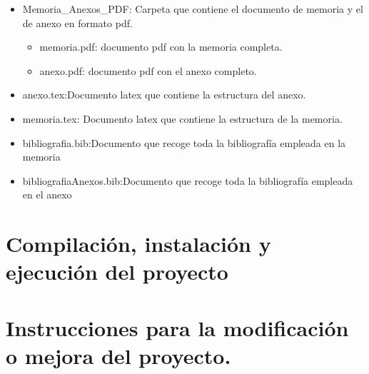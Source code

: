 \begin{itemize}
    \item Memoria\_Anexos\_PDF: Carpeta que contiene el documento de memoria y el de anexo en formato pdf.
    \begin{itemize}
        \item memoria.pdf: documento pdf con la memoria completa.
        \item anexo.pdf: documento pdf con el anexo completo.
    \end{itemize}
    \item anexo.tex:Documento latex que contiene la estructura del anexo.
    \item memoria.tex: Documento latex que contiene la estructura de la memoria.
    \item bibliografia.bib:Documento que recoge toda la bibliografía empleada en la memoria
    \item bibliografiaAnexos.bib:Documento que recoge toda la bibliografía empleada en el anexo
\end{itemize}
\section{Compilación, instalación y ejecución del proyecto}


\section{Instrucciones para la modificación o mejora del proyecto.}
